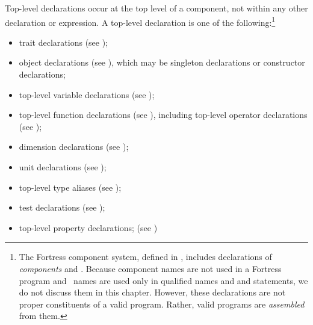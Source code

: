 Top-level declarations occur at the top level of a component,
not within any other declaration or expression.
A top-level declaration is one of the following:\footnote{The
Fortress component system, defined in ,
includes declarations of \emph{components} and \emph{\apisN}.
Because component names are not used in a Fortress program and
\apiN\ names are used only in
qualified names and
 and  statements,
we do not discuss them in this chapter.
However, these declarations are not proper constituents of a valid
program.  Rather, valid programs are \emph{assembled} from them.
}
\begin{itemize}

\item
trait declarations (see );

\item
object declarations (see ),
which may be singleton declarations or constructor declarations;

\item
top-level variable declarations
(see );

\item
top-level function declarations
(see ),
including top-level operator declarations
(see );

\item
dimension declarations (see );

\item
unit declarations (see );

\item
top-level type aliases (see );

\item
test declarations
(see );

\item
top-level property declarations;
(see )

\end{itemize}

